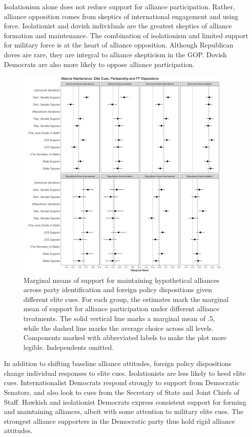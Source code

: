 \documentclass[12pt]{article}
\begin{document}
Isolationism alone does not reduce support for alliance participation.
Rather, alliance opposition comes from skeptics of international engagement and using force. 
Isolationist and dovish individuals are the greatest skeptics of alliance formation and maintenance. 
The combination of isolationism and limited support for military force is at the heart of alliance opposition. 
Although Republican doves are rare, they are integral to alliance skepticism in the GOP. 
Dovish Democrats are also more likely to oppose alliance participation.  


\begin{figure}
	\centering
		\includegraphics[width=0.95\textwidth]{../figures/party-dispo-main-el.png}
	\caption{Marginal means of support for maintaining hypothetical alliances across party identification and foreign policy dispositions given different elite cues. For each group, the estimates mark the marginal mean of support for alliance participation under different alliance treatments. The solid vertical line marks a marginal mean of .5, while the dashed line marks the average choice across all levels. Components marked with abbreviated labels to make the plot more legible. Independents omitted.}
	\label{fig:party-dispo-main-el}
\end{figure}


In addition to shifting baseline alliance attitudes, foreign policy dispositions change individual responses to elite cues. 
Isolationists are less likely to heed elite cues. 
Internationalist Democrats respond strongly to support from Democratic Senators, and also look to cues from the Secretary of State and Joint Chiefs of Staff. 
Hawkish and isolationist Democrats express consistent support for forming and maintaining alliances, albeit with some attention to military elite cues. 
The strongest alliance supporters in the Democratic party thus hold rigid alliance attitudes.
\end{document}
